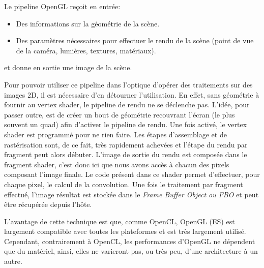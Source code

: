 
Le pipeline OpenGL reçoit en entrée:
\begin{itemize}
\item Des informations sur la géométrie de la scène.
\item Des paramètres nécessaires pour effectuer le rendu de la scène (point de vue de la caméra, lumières, textures, matériaux).
\end{itemize}
et donne en sortie une image de la scène.

Pour pouvoir utiliser ce pipeline dans l'optique d'opérer des traitements sur des images 2D, il est nécessaire d'en détourner l'utilisation. En effet, sans géométrie à fournir au vertex shader, le pipeline de rendu ne se déclenche pas. L'idée, pour passer outre, est de créer un bout de géométrie recouvrant l'écran (le plus souvent un quad) afin d'activer le pipeline de rendu. Une fois activé, le vertex shader est programmé pour ne rien faire. Les étapes d'assemblage et de rastérisation sont, de ce fait, très rapidement achevées et l'étape du rendu par fragment peut alors débuter. L'image de sortie du rendu est composée dans le fragment shader, c'est donc ici que nous avons accès à chacun des pixels composant l'image finale. Le code présent dans ce shader permet d'effectuer, pour chaque pixel, le calcul de la convolution. Une fois le traitement par fragment effectué, l'image résultat est stockée dans le \emph{Frame Buffer Object ou FBO} et peut être récupérée depuis l'hôte.

L'avantage de cette technique est que, comme OpenCL, OpenGL (ES) est largement compatible avec toutes les plateformes et est très largement utilisé. Cependant, contrairement à OpenCL, les performances d'OpenGL ne dépendent que du matériel, ainsi, elles ne varieront pas, ou très peu, d'une architecture à un autre.

